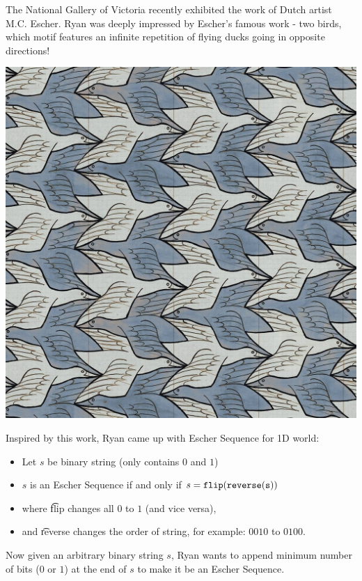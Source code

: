 The National Gallery of Victoria recently exhibited the work of Dutch artist M.C. Escher.
Ryan was deeply impressed by Escher's famous work - two birds,
which motif features an infinite repetition of flying ducks going in opposite directions!

\begin{center}
  \includegraphics[scale=0.2, natwidth=1200, natheight=1200]{two-birds.jpg}
\end{center}

Inspired by this work, Ryan came up with Escher Sequence for 1D world:

\begin{itemize}
  \item Let $s$ be binary string (only contains $0$ and $1$)
  \item $s$ is an Escher Sequence if and only if $s = \t{flip(reverse(s))}$
  \item where \t{flip} changes all $0$ to $1$ (and vice versa),
  \item and \t{reverse} changes the order of string, for example: $0010$ to $0100$.
\end{itemize}

Now given an arbitrary binary string $s$,
Ryan wants to append minimum number of bits ($0$ or $1$) at the end of $s$ to make it be an Escher Sequence.
